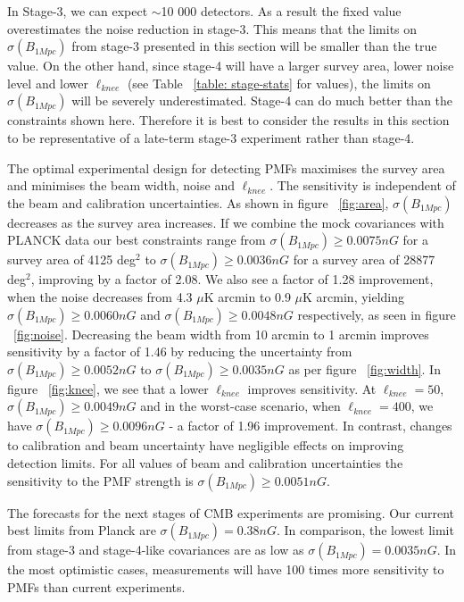 In Stage-3, we can expect $\sim$10 000 detectors. As a result the fixed value overestimates the noise reduction in stage-3. This means that the limits on $\sigma(B_{1Mpc})$ from stage-3 presented in this section will be smaller than the true value. On the other hand, since stage-4 will have a larger survey area, lower noise level and lower $\ell_{knee}$ (see Table ~\ref{table: stage-stats} for values), the limits on $\sigma(B_{1Mpc})$ will be severely underestimated. Stage-4 can do much better than the constraints shown here. Therefore it is best to consider the results in this section to be representative of a late-term stage-3 experiment rather than stage-4.

The optimal experimental design for detecting PMFs maximises the survey area and minimises the beam width, noise and $\ell_{knee}$. The sensitivity is independent of the beam and calibration uncertainties. As shown in figure ~\ref{fig:area}, $\sigma(B_{1Mpc})$ decreases as the survey area increases. If we combine the mock covariances with PLANCK data our best constraints range from $\sigma(B_{1Mpc}) \geq 0.0075nG$ for a survey area of 4125 deg$^2$ to $\sigma(B_{1Mpc}) \geq 0.0036nG$ for a survey area of 28877 deg$^2$, improving by a factor of 2.08. We also see a factor of 1.28 improvement, when the noise decreases from 4.3 $\mu$K arcmin to 0.9 $\mu$K arcmin, yielding  $\sigma(B_{1Mpc}) \geq 0.0060nG$ and $\sigma(B_{1Mpc}) \geq 0.0048nG$ respectively, as seen in figure ~\ref{fig:noise}. Decreasing the beam width from 10 arcmin to 1 arcmin improves sensitivity by a factor of 1.46 by reducing the uncertainty from $\sigma(B_{1Mpc}) \geq 0.0052nG$ to $\sigma(B_{1Mpc}) \geq 0.0035nG$ as per figure ~\ref{fig:width}. In figure ~\ref{fig:knee}, we see that a lower $\ell_{knee}$ improves sensitivity. At $\ell_{knee} = 50$, $\sigma(B_{1Mpc}) \geq 0.0049nG$ and in the worst-case scenario, when $\ell_{knee} = 400$, we have $\sigma(B_{1Mpc}) \geq 0.0096nG$ - a factor of 1.96 improvement. In contrast, changes to calibration and beam uncertainty have negligible effects on improving detection limits. For all values of beam and calibration uncertainties the sensitivity to the PMF strength is $\sigma(B_{1Mpc}) \geq 0.0051nG$.

The forecasts for the next stages of CMB experiments are promising. Our current best limits from Planck are $\sigma(B_{1Mpc}) = 0.38nG$. In comparison, the lowest limit from stage-3 and stage-4-like covariances are as low as $\sigma(B_{1Mpc}) = 0.0035nG$. In the most optimistic cases, measurements will have 100 times more sensitivity to PMFs than current experiments.

